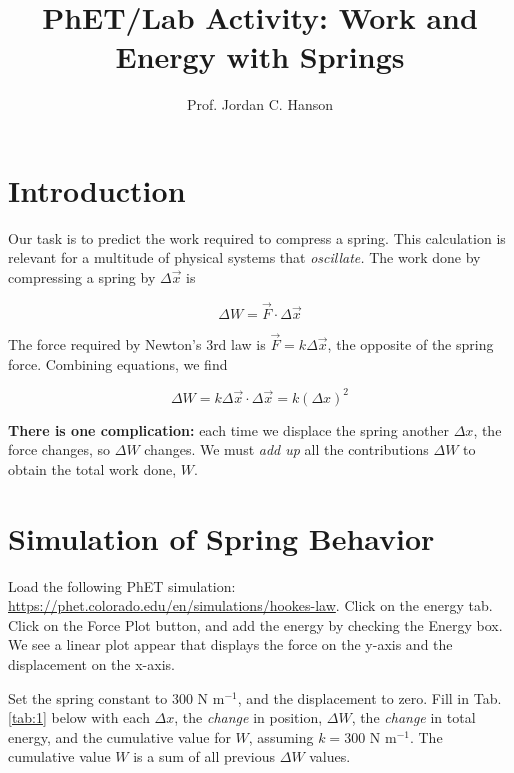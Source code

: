 \documentclass{article}
\begin{document}
\twocolumn

\title{PhET/Lab Activity: Work and Energy with Springs}
\author{Prof. Jordan C. Hanson}

\maketitle

\section{Introduction}

Our task is to predict the work required to compress a spring.  This calculation is relevant for a multitude of physical systems that \textit{oscillate.}  The work done by compressing a spring by $\Delta \vec{x}$ is 

\begin{equation}
\Delta W = \vec{F} \cdot \Delta \vec{x}
\end{equation}

The force required by Newton's 3rd law is $\vec{F} = k\Delta \vec{x}$, the opposite of the spring force.  Combining equations, we find

\begin{equation}
\Delta W = k\Delta \vec{x} \cdot \Delta \vec{x} = k (\Delta x)^2 \label{eq:1}
\end{equation}

\textbf{There is one complication:} each time we displace the spring another $\Delta x$, the force changes, so $\Delta W$ changes.  We must \textit{add up} all the contributions $\Delta W$ to obtain the total work done, $W$.

\section{Simulation of Spring Behavior}

Load the following PhET simulation: \url{https://phet.colorado.edu/en/simulations/hookes-law}.  Click on the energy tab.  Click on the Force Plot button, and add the energy by checking the Energy box.  We see a linear plot appear that displays the force on the y-axis and the displacement on the x-axis.

Set the spring constant to 300 N m$^{-1}$, and the displacement to zero.  Fill in Tab. \ref{tab:1} below with each $\Delta x$, the \textit{change} in position, $\Delta W$, the \textit{change} in total energy, and the cumulative value for $W$, assuming $k = 300$ N m$^{-1}$.  The cumulative value $W$ is a sum of all previous $\Delta W$ values.
\end{document}
